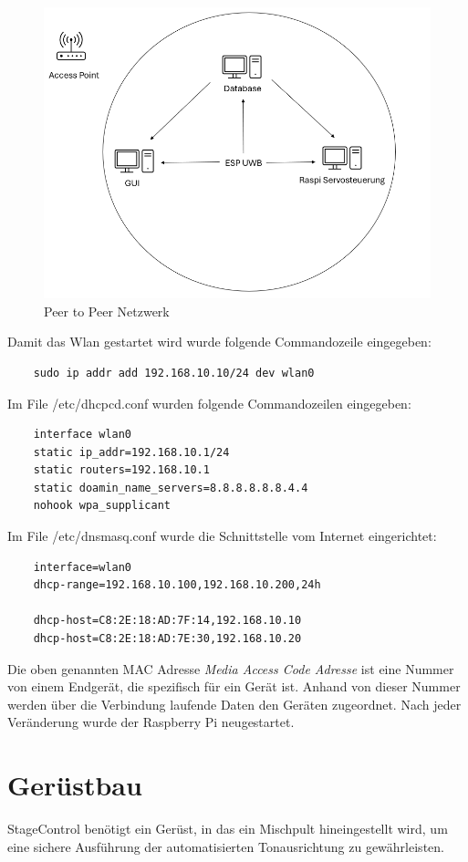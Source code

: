 \begin{figure}[H]
	\centering
	\includegraphics[width=0.5\linewidth]{images/Peer to Peer Netzwerk.png}
	\caption[Peer to Peer Netzwerk]{Peer to Peer Netzwerk}
	\label{fig:Peer to Peer Netzwerk} 
\end{figure}

\newpage
Damit das Wlan gestartet wird wurde folgende Commandozeile eingegeben: 
\begin{lstlisting}
	sudo ip addr add 192.168.10.10/24 dev wlan0 
\end{lstlisting}

Im File /etc/dhcpcd.conf wurden folgende Commandozeilen eingegeben: 
\begin{lstlisting}
	interface wlan0
	static ip_addr=192.168.10.1/24
	static routers=192.168.10.1
	static doamin_name_servers=8.8.8.8.8.8.4.4
	nohook wpa_supplicant
\end{lstlisting}

Im File /etc/dnsmasq.conf wurde die Schnittstelle vom Internet eingerichtet:
\begin{lstlisting}
	interface=wlan0
	dhcp-range=192.168.10.100,192.168.10.200,24h
	
	dhcp-host=C8:2E:18:AD:7F:14,192.168.10.10
	dhcp-host=C8:2E:18:AD:7E:30,192.168.10.20
\end{lstlisting} 

Die oben genannten MAC Adresse \textit{Media Access Code Adresse} ist eine Nummer von einem Endgerät, die spezifisch für ein Gerät ist. Anhand von dieser Nummer werden über die Verbindung laufende Daten den Geräten zugeordnet. Nach jeder Veränderung wurde der Raspberry Pi neugestartet. 

\newpage
\section{Gerüstbau}
StageControl benötigt ein Gerüst, in das ein Mischpult hineingestellt wird, um eine sichere Ausführung der automatisierten Tonausrichtung zu gewährleisten. 


